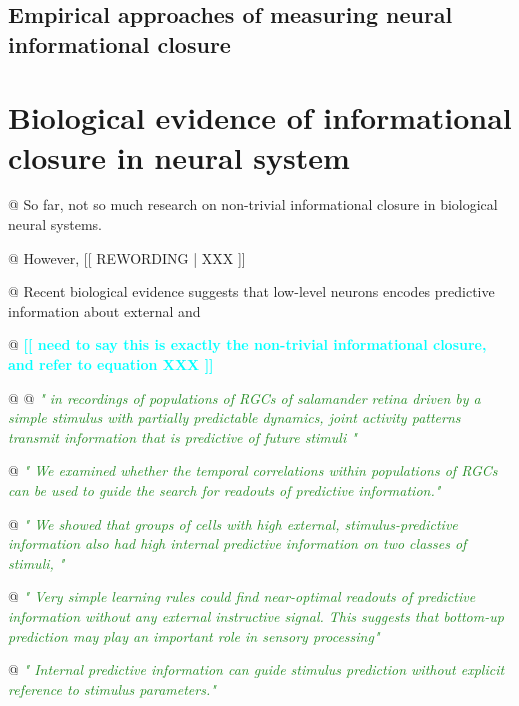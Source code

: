 \documentclass[utf8]{article}
\newenvironment{ants}
			{
			 \begin{easylist}[itemize]
			}
			{
			\end{easylist}
			}
\newcommand{\rewrite}[1]{\textcolor{ForestGreen}{\textit{"#1"}}\newline}
\newcommand{\rewording}[1]{\textcolor{RawSienna}{[[ REWORDING | #1 ]]}}
\newcommand{\toWrite}[1]{\noindent
			\textcolor{Cyan}{\textbf{[[ #1 ]]}}}
\begin{document}
			
			
		\subsection{Empirical approaches of measuring neural informational closure}
		
		
	\section{Biological evidence of informational closure in neural system}
		
		\begin{ants}		
			
			
			@ So far, not so much research on non-trivial informational closure in biological neural systems. 
			
			@ However, \rewording{XXX}
			
			@ Recent biological evidence suggests that low-level neurons encodes predictive information about external  and 
			
			@ \toWrite{
				need to say this is exactly the non-trivial informational closure, and refer to equation XXX}
			
			@ \cite{sederberg2018learning}
			@ \rewrite{
				in recordings of populations of RGCs of salamander retina driven by a simple stimulus with partially predictable dynamics, joint activity patterns transmit information that is predictive of future stimuli }
			
			@ \rewrite{
				We examined whether the temporal correlations within populations of RGCs can be used to guide the search for readouts of predictive information.}
			
			@ \rewrite{
				We showed that groups of cells with high external, stimulus-predictive information also had high internal predictive information on two classes of stimuli, }
			
			@ \rewrite{
				Very simple learning rules could find near-optimal readouts of predictive information without any external instructive signal. This suggests that bottom-up prediction may play an important role in sensory processing}
			
			@ \rewrite{
				Internal predictive information can guide stimulus prediction without explicit reference to stimulus parameters.}
			

\end{ants}
\end{document}
